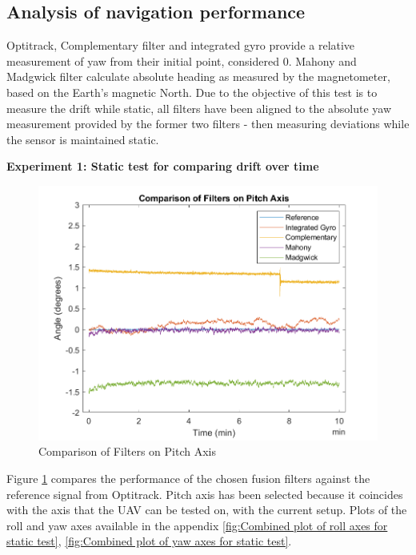 \subsection{Analysis of navigation performance}

Optitrack, Complementary filter and integrated gyro provide a relative measurement of yaw from their initial point, considered 0.
Mahony and Madgwick filter calculate absolute heading as measured by the magnetometer, based on the Earth's magnetic North. 
Due to the objective of this test is to measure the drift while static, all filters have been aligned to the absolute yaw measurement provided by the former two filters - then measuring deviations while the sensor is maintained static. 

\textbf{Experiment 1: Static test for comparing drift over time}

\begin{figure}[H]
    \centering
    \includegraphics[scale=1]{graphics/Navigation/CombinedStaticPitch.png}
    \caption{Comparison of Filters on Pitch Axis}
     \label{fig:Comparison of Filters on Pitch Axis}
\end{figure} 

Figure \ref{fig:Comparison of Filters on Pitch Axis} compares the performance of the chosen fusion filters against the reference signal from Optitrack. Pitch axis has been selected because it coincides with the axis that the UAV can be tested on, with the current setup. Plots of the roll and yaw axes available in the appendix \ref{fig:Combined plot of roll axes for static test}, \ref{fig:Combined plot of yaw axes for static test}.

